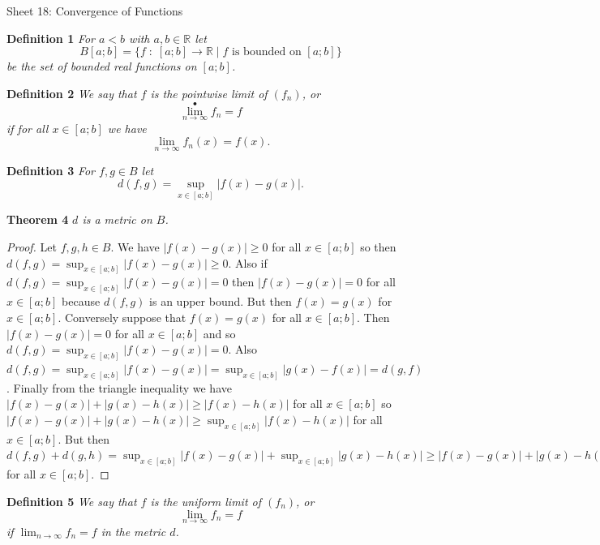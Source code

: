 \documentclass{article}
\begin{document}
\begin{flushleft}

\Large

Sheet 18: Convergence of Functions\newline

\normalsize

\textbf{Definition 1}
\textsl{For $a < b$ with $a,b \in \mathbb{R}$ let
\[
B[a;b] = \{f \; : \; [a;b] \rightarrow \mathbb{R} \mid \text{$f$ is bounded on $[a;b]$}\}
\]
be the set of bounded real functions on $[a;b]$.}\newline

\textbf{Definition 2}
\textsl{We say that $f$ is the pointwise limit of $(f_n)$, or
\[
\lim_{n \rightarrow \infty}^{\bullet} f_n = f
\]
if for all $x \in [a;b]$ we have
\[
\lim_{n \rightarrow \infty} f_n (x) = f(x).
\]}\newline

\textbf{Definition 3}
\textsl{For $f,g \in B$ let
\[
d(f,g) = \sup_{x \in [a;b]} | f(x) - g(x) |.
\]}\newline

\textbf{Theorem 4}
\textsl{$d$ is a metric on $B$.}
\begin{proof}
Let $f,g,h \in B$. We have $|f(x) - g(x)| \geq 0$ for all $x \in [a;b]$ so then $d(f,g) = \sup_{x \in [a;b]} |f(x) - g(x)| \geq 0$. Also if $d(f,g) = \sup_{x \in [a;b]} |f(x) - g(x)| = 0$ then $|f(x) - g(x)| = 0$ for all $x \in [a;b]$ because $d(f,g)$ is an upper bound. But then $f(x) = g(x)$ for $x \in [a;b]$. Conversely suppose that $f(x) = g(x)$ for all $x \in [a;b]$. Then $|f(x) - g(x)| = 0$ for all $x \in [a;b]$ and so $d(f,g) = \sup_{x \in [a;b]} |f(x) - g(x)| = 0$. Also $d(f,g) = \sup_{x \in [a;b]} |f(x) - g(x)| = \sup_{x \in [a;b]} |g(x) - f(x)| = d(g,f)$. Finally from the triangle inequality we have $|f(x) - g(x)| + |g(x) - h(x)| \geq |f(x) - h(x)|$ for all $x \in [a;b]$ so $|f(x) - g(x)| + |g(x) - h(x)| \geq \sup_{x \in [a;b]} |f(x) - h(x)|$ for all $x \in [a;b]$. But then $d(f,g) + d(g,h) = \sup_{x \in [a;b]} |f(x) - g(x)| + \sup_{x \in [a;b]} |g(x) - h(x)| \geq |f(x) - g(x)| + |g(x) - h(x)| \geq \sup_{x \in [a;b]} |f(x) - h(x)| = d(f,h)$ for all $x \in [a;b]$.
\end{proof}

\textbf{Definition 5}
\textsl{We say that $f$ is the uniform limit of $(f_n)$, or
\[
\lim_{n \rightarrow \infty} f_n = f
\]
if $\lim_{n \rightarrow \infty} f_n = f$ in the metric $d$.}\newline


\end{flushleft}
\end{document}
